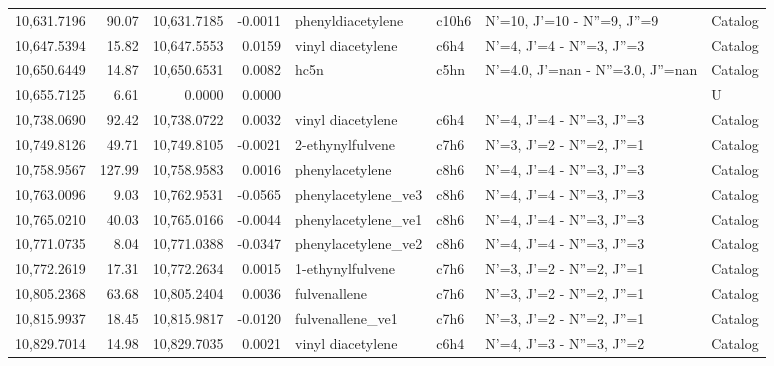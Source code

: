 \begin{longtable}{rrrrllll}
10,631.7196 &     90.07 &       10,631.7185 &   -0.0011 &           phenyldiacetylene &   c10h6 &          N'=10, J'=10 - N''=9, J''=9 &    Catalog \\
10,647.5394 &     15.82 &       10,647.5553 &    0.0159 &           vinyl diacetylene &    c6h4 &            N'=4, J'=4 - N''=3, J''=3 &    Catalog \\
10,650.6449 &     14.87 &       10,650.6531 &    0.0082 &                        hc5n &    c5hn &    N'=4.0, J'=nan - N''=3.0, J''=nan &    Catalog \\
10,655.7125 &      6.61 &            0.0000 &    0.0000 &                             &         &                                      &          U \\
10,738.0690 &     92.42 &       10,738.0722 &    0.0032 &           vinyl diacetylene &    c6h4 &            N'=4, J'=4 - N''=3, J''=3 &    Catalog \\
10,749.8126 &     49.71 &       10,749.8105 &   -0.0021 &            2-ethynylfulvene &    c7h6 &            N'=3, J'=2 - N''=2, J''=1 &    Catalog \\
10,758.9567 &    127.99 &       10,758.9583 &    0.0016 &             phenylacetylene &    c8h6 &            N'=4, J'=4 - N''=3, J''=3 &    Catalog \\
10,763.0096 &      9.03 &       10,762.9531 &   -0.0565 &         phenylacetylene_ve3 &    c8h6 &            N'=4, J'=4 - N''=3, J''=3 &    Catalog \\
10,765.0210 &     40.03 &       10,765.0166 &   -0.0044 &         phenylacetylene_ve1 &    c8h6 &            N'=4, J'=4 - N''=3, J''=3 &    Catalog \\
10,771.0735 &      8.04 &       10,771.0388 &   -0.0347 &         phenylacetylene_ve2 &    c8h6 &            N'=4, J'=4 - N''=3, J''=3 &    Catalog \\
10,772.2619 &     17.31 &       10,772.2634 &    0.0015 &            1-ethynylfulvene &    c7h6 &            N'=3, J'=2 - N''=2, J''=1 &    Catalog \\
10,805.2368 &     63.68 &       10,805.2404 &    0.0036 &                fulvenallene &    c7h6 &            N'=3, J'=2 - N''=2, J''=1 &    Catalog \\
10,815.9937 &     18.45 &       10,815.9817 &   -0.0120 &            fulvenallene_ve1 &    c7h6 &            N'=3, J'=2 - N''=2, J''=1 &    Catalog \\
10,829.7014 &     14.98 &       10,829.7035 &    0.0021 &           vinyl diacetylene &    c6h4 &            N'=4, J'=3 - N''=3, J''=2 &    Catalog \\

\end{longtable}
